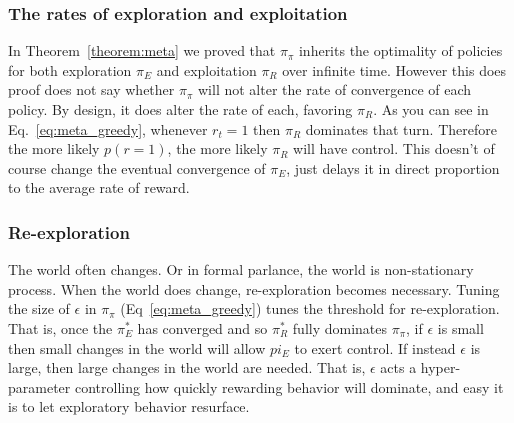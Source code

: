 \documentclass[9pt,twocolumn,twoside]{pnas-new}
\begin{document}
\subsubsection*{The rates of exploration and exploitation}
In Theorem~\ref{theorem:meta} we proved that $\pi_{\pi}$ inherits the optimality of policies for both exploration $\pi_E$ and exploitation $\pi_R$ over infinite time. However this does proof does not say whether $\pi_{\pi}$ will not alter the rate of convergence of each policy. By design, it does alter the rate of each, favoring $\pi_R$. As you can see in Eq.~\ref{eq:meta_greedy}, whenever $r_t = 1$ then $\pi_R$ dominates that turn. Therefore the more likely $p(r=1)$, the more likely $\pi_R$ will have control. This doesn't of course change the eventual convergence of $\pi_E$, just delays it in direct proportion to the average rate of reward.




\subsubsection*{Re-exploration}
The world often changes. Or in formal parlance, the world is non-stationary process. When the world does change, re-exploration becomes necessary. Tuning the size of $\epsilon$ in $\pi_{\pi}$ (Eq~\ref{eq:meta_greedy}) tunes the threshold for re-exploration. That is, once the $\pi^*_E$ has converged and so $\pi^*_R$ fully dominates $\pi_{\pi}$, if $\epsilon$ is small then small changes in the world will allow $pi_E$ to exert control. If instead $\epsilon$ is large, then large changes in the world are needed. That is, $\epsilon$ acts a hyper-parameter controlling how quickly rewarding behavior will dominate, and easy it is to let exploratory behavior resurface.
\end{document}
